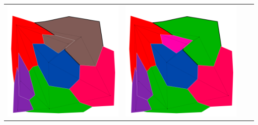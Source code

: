\documentclass[10pt,a4paper]{article}
\begin{document}
\begin{tabular}{c c c c }
	\includegraphics[scale=.10]{../results/backtracking_mac/map_build/bt_mac_I00007.pdf}&
	\includegraphics[scale=.10]{../results/backtracking_mac/map_build/bt_mac_I00008.pdf}\\
	

\end{tabular}
\end{document}
